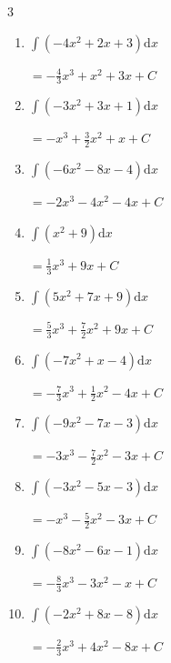 \begin{multicols}{3}
\begin{enumerate}
\columnbreak %

\resetques

  \item $\displaystyle \int \left( -4x^{2}+2x+3 \right) \mathrm{d}x$

        $\displaystyle =-\frac{4}{3}x^{3}+x^{2}+3x+ C$

  \item $\displaystyle \int \left( -3x^{2}+3x+1 \right) \mathrm{d}x$

        $\displaystyle =-x^{3}+\frac{3}{2}x^{2}+x+ C$

  \item $\displaystyle \int \left( -6x^{2}-8x-4 \right) \mathrm{d}x$

        $\displaystyle =-2x^{3}-4x^{2}-4x+ C$

  \item $\displaystyle \int \left( x^{2}+9 \right) \mathrm{d}x$

        $\displaystyle =\frac{1}{3}x^{3}+9x+ C$

  \item $\displaystyle \int \left( 5x^{2}+7x+9 \right) \mathrm{d}x$

        $\displaystyle =\frac{5}{3}x^{3}+\frac{7}{2}x^{2}+9x+ C$

  \item $\displaystyle \int \left( -7x^{2}+x-4 \right) \mathrm{d}x$

        $\displaystyle =-\frac{7}{3}x^{3}+\frac{1}{2}x^{2}-4x+ C$

  \item $\displaystyle \int \left( -9x^{2}-7x-3 \right) \mathrm{d}x$

        $\displaystyle =-3x^{3}-\frac{7}{2}x^{2}-3x+ C$

  \item $\displaystyle \int \left( -3x^{2}-5x-3 \right) \mathrm{d}x$

        $\displaystyle =-x^{3}-\frac{5}{2}x^{2}-3x+ C$

  \item $\displaystyle \int \left( -8x^{2}-6x-1 \right) \mathrm{d}x$

        $\displaystyle =-\frac{8}{3}x^{3}-3x^{2}-x+ C$

  \item $\displaystyle \int \left( -2x^{2}+8x-8 \right) \mathrm{d}x$

        $\displaystyle =-\frac{2}{3}x^{3}+4x^{2}-8x+ C$

\columnbreak %


\end{enumerate}
\end{multicols}
